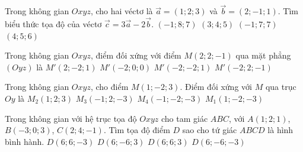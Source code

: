 \begin{ex}%
	Trong không gian $Oxyz$, cho hai véctơ là $\vec{a}=(1;2;3)$ và $\vec{b}=(2;-1;1)$. Tìm biểu thức tọa độ của véctơ  $\vec{c}=3\vec{a}-2\vec{b}$.
	\choice
	{\True $(-1;8;7) $}
	{$(3;4;5)$}
	{$(-1;7;7)$}
	{$(4;5;6)$}
\end{ex}	 
\begin{ex}%
Trong không gian $Oxyz$, điểm đối xứng với điểm $M(2;2;-1)$ qua mặt phẳng $(Oyz)$ là
\choice
{$M'(2;-2;1)$}
{$M'(-2;0;0)$}
{$M'(-2;-2;1)$}
{\True $M'(-2;2;-1)$}
\end{ex}

\begin{ex}%
	Trong không gian $Oxyz$, cho điểm $M(1;-2;3)$. Điểm đối xứng với $M$ qua trục $Oy$ là
	\choice
	{$M_{2}(1;2;3)$}
	{$M_{3}(-1;2;-3)$}
	{\True $M_{4}(-1;-2;-3)$}
	{$M_{1}(1;-2;-3)$}
\end{ex}

\begin{ex}%
	Trong không gian với hệ trục tọa độ $Oxyz$ cho tam giác $ABC$, với $A(1;2;1)$, $B(-3;0;3)$, $C(2;4;-1)$. Tìm tọa độ điểm $D$ sao cho tứ giác $ABCD$ là hình bình hành.		
	\choice
	{\True $D(6;6;-3)$}
	{$D(6;-6;3)$}
	{$D(6;6;3)$}
	{$D(6;-6;-3)$}
\end{ex}

